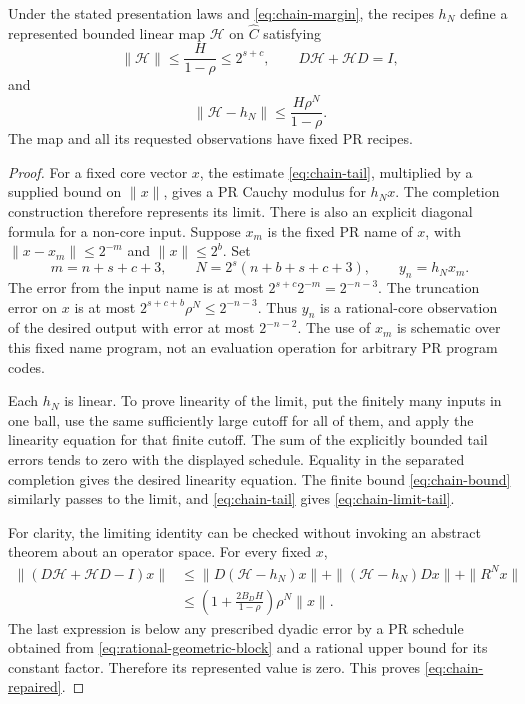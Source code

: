 \begin{theorem}
\label{thm:chain-repair}
Under the stated presentation laws and \eqref{eq:chain-margin}, the recipes
$h_N$ define a represented bounded linear map $\mathcal H$ on
$\widehat C$ satisfying
\begin{equation}
 \|\mathcal H\|\le\frac{H}{1-\rho}\le2^{s+c},\qquad
 D\mathcal H+\mathcal H D=I,
 \label{eq:chain-repaired}
\end{equation}
and
\begin{equation}
          \|\mathcal H-h_N\|
                   \le\frac{H\rho^N}{1-\rho}.
          \label{eq:chain-limit-tail}
\end{equation}
The map and all its requested observations have fixed PR recipes.
\end{theorem}
\begin{proof}
For a fixed core vector $x$, the estimate \eqref{eq:chain-tail}, multiplied
by a supplied bound on $\|x\|$, gives a PR Cauchy modulus for $h_Nx$.
The completion construction therefore represents its limit.
There is also an explicit diagonal formula for a non-core input.
Suppose $x_m$ is the fixed PR name of $x$, with
$\|x-x_m\|\le2^{-m}$ and $\|x\|\le2^b$.  Set
\[
 m=n+s+c+3,\qquad
 N=2^s(n+b+s+c+3),\qquad y_n=h_Nx_m.
\]
The error from the input name is at most
$2^{s+c}2^{-m}=2^{-n-3}$.  The truncation error on $x$ is at most
$2^{s+c+b}\rho^N\le2^{-n-3}$.  Thus $y_n$ is a rational-core
observation of the desired output with error at most $2^{-n-2}$.
The use of $x_m$ is schematic over this fixed name program, not an
evaluation operation for arbitrary PR program codes.

Each $h_N$ is linear.  To prove linearity of the limit, put the finitely
many inputs in one ball, use the same sufficiently large cutoff for all
of them, and apply the linearity equation for that finite cutoff.  The
sum of the explicitly bounded tail errors tends to zero with the displayed
schedule.  Equality in the separated completion gives the desired
linearity equation.  The finite bound \eqref{eq:chain-bound} similarly
passes to the limit, and \eqref{eq:chain-tail} gives
\eqref{eq:chain-limit-tail}.

For clarity, the limiting identity can be checked without invoking an
abstract theorem about an operator space.  For every fixed $x$,
\begin{align*}
 \|(D\mathcal H+\mathcal H D-I)x\|
 &\le \|D(\mathcal H-h_N)x\|
       +\|(\mathcal H-h_N)Dx\|+\|R^Nx\|\\
 &\le \left(1+\frac{2B_DH}{1-\rho}\right)\rho^N\|x\|.
\end{align*}
The last expression is below any prescribed dyadic error by a PR
schedule obtained from \eqref{eq:rational-geometric-block} and a rational
upper bound for its constant factor.  Therefore its represented value is
zero.  This proves \eqref{eq:chain-repaired}.
\end{proof}

